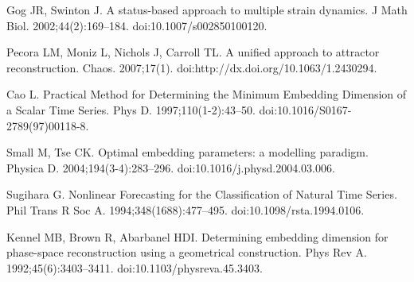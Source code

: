 \documentclass[10pt,letterpaper]{article}
\begin{document}
\begin{thebibliography}{10}
Gog JR, Swinton J.
\newblock A status-based approach to multiple strain dynamics.
\newblock J Math Biol. 2002;44(2):169--184.
\newblock doi:{10.1007/s002850100120}.

Pecora LM, Moniz L, Nichols J, Carroll TL.
\newblock A unified approach to attractor reconstruction.
\newblock Chaos. 2007;17(1).
\newblock doi:{http://dx.doi.org/10.1063/1.2430294}.

Cao L.
\newblock Practical Method for Determining the Minimum Embedding Dimension of a
  Scalar Time Series.
\newblock Phys D. 1997;110(1-2):43--50.
\newblock doi:{10.1016/S0167-2789(97)00118-8}.

Small M, Tse CK.
\newblock Optimal embedding parameters: a modelling paradigm.
\newblock Physica D. 2004;194(3-4):283--296.
\newblock doi:{10.1016/j.physd.2004.03.006}.

Sugihara G.
\newblock Nonlinear Forecasting for the Classification of Natural Time Series.
\newblock Phil Trans R Soc A. 1994;348(1688):477--495.
\newblock doi:{10.1098/rsta.1994.0106}.

Kennel MB, Brown R, Abarbanel HDI.
\newblock Determining embedding dimension for phase-space reconstruction using
  a geometrical construction.
\newblock Phys Rev A. 1992;45(6):3403--3411.
\newblock doi:{10.1103/physreva.45.3403}.

\end{thebibliography}
\end{document}
